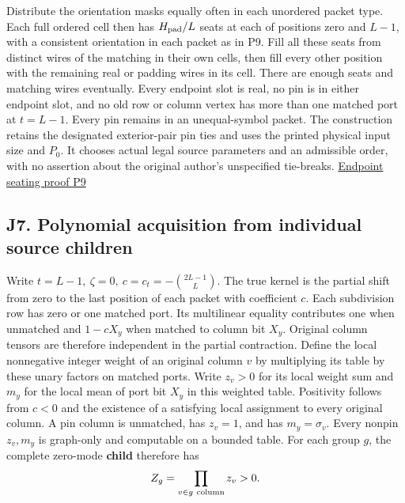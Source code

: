 \documentclass[11pt,a4paper]{article}
\begin{document}
Distribute the orientation masks equally often in each unordered packet
type. Each full ordered cell then has \(H_{\rm pad}/L\) seats at each of
positions zero and \(L-1\), with a consistent orientation in each packet
as in P9. Fill all these seats from distinct wires of the matching in
their own cells, then fill every other position with the remaining real
or padding wires in its cell. There are enough seats and matching wires
eventually. Every endpoint slot is real, no pin is in either endpoint
slot, and no old row or column vertex has more than one matched port at
\(t=L-1\). Every pin remains in an unequal-symbol packet. The
construction retains the designated exterior-pair pin ties and uses the
printed physical input size and \(P_0\). It chooses actual legal source
parameters and an admissible order, with no assertion about the original
author's unspecified tie-breaks.
\hyperref[v9-section-precision-frontier]{Endpoint seating proof P9}

\subsection{J7. Polynomial acquisition from individual source
children}\label{v9-j7-polynomial-acquisition-from-individual-source-children}

Write \(t=L-1,\ \zeta=0,\ c=c_t=-\binom{2L-1}{L}\). The true kernel is
the partial shift from zero to the last position of each packet with
coefficient \(c\). Each subdivision row has zero or one matched port.
Its multilinear equality contributes one when unmatched and \(1-cX_y\)
when matched to column bit \(X_y\). Original column tensors are
therefore independent in the partial contraction. Define the local
nonnegative integer weight of an original column \(v\) by multiplying
its table by these unary factors on matched ports. Write \(z_v>0\) for
its local weight sum and \(m_y\) for the local mean of port bit \(X_y\)
in this weighted table. Positivity follows from \(c<0\) and the
existence of a satisfying local assignment to every original column. A
pin column is unmatched, has \(z_v=1\), and has \(m_y=\sigma_v\). Every
nonpin \(z_v,m_y\) is graph-only and computable on a bounded table. For
each group \(g\), the complete zero-mode \textbf{child} therefore has \[
                           Z_g=\prod_{v\in g\ {\rm column}}z_v>0.
\]
\end{document}
